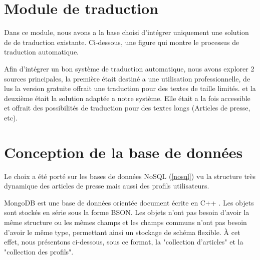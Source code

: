             
            


\section{Module de traduction}

Dans ce module, nous avons a la base choisi d'intégrer uniquement une solution de de traduction existante. Ci-dessous, une figure qui montre le processus de traduction automatique.



Afin d'intégrer un bon système de traduction automatique, nous avons explorer 2 sources principales, la première était destiné a une utilisation professionnelle, de lus la version gratuite offrait une traduction pour des textes de taille limités. et la deuxième était la solution adaptée a notre système. Elle était a la fois accessible et offrait des possibilités de traduction pour des textes longs (Articles de presse, etc). 

\section{Conception de la base de données}
Le choix a été porté sur les bases de données NoSQL (\autoref{nosql}) vu la structure très dynamique des articles de presse mais aussi des profils utilisateurs.

MongoDB est une base de données orientée document écrite en C++ \cite{NOSQL3}. Les objets sont stockés en série sous la forme BSON.
Les objets n'ont pas besoin d'avoir la même structure ou les mêmes champs et les champs communs n'ont pas besoin d'avoir le même type, permettant ainsi un stockage de schéma flexible. À cet effet, nous présentons ci-dessous, sous ce format, la "collection d'articles" et la "collection des profils".

